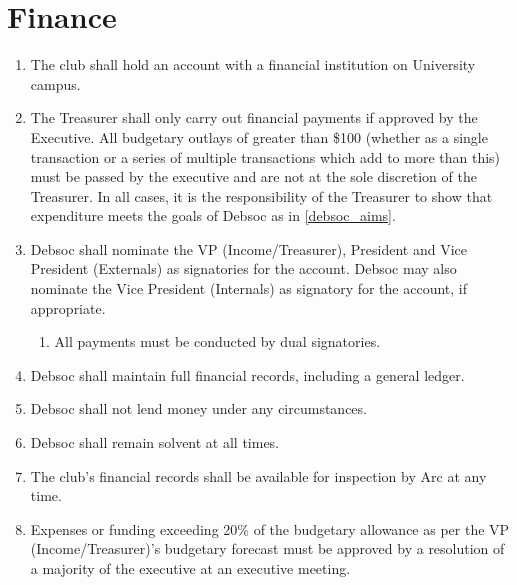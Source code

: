 \newpage
\section{Finance} \label{finances_section}

\begin{enumerate}
\item The club shall hold an account with a financial institution on University campus.
\item The Treasurer shall only carry out financial payments if approved by the Executive. All budgetary outlays of greater than \$100 (whether as a single transaction or a series of multiple transactions which add to more than this) must be passed by the executive and are not at the sole discretion of the Treasurer. In all cases, it is the responsibility of the Treasurer to show that expenditure meets the goals of Debsoc as in \ref{debsoc_aims}.
\item Debsoc shall nominate the VP (Income/Treasurer), President and Vice President (Externals) as signatories for the account. Debsoc may also nominate the Vice President (Internals) as signatory for the account, if appropriate.
\begin{enumerate}
    \item All payments must be conducted by dual signatories.
\end{enumerate}
\item Debsoc shall maintain full financial records, including a general ledger.
\item Debsoc shall not lend money under any circumstances.
\item Debsoc shall remain solvent at all times.
\item The club’s financial records shall be available for inspection by Arc at any time.
\item Expenses or funding exceeding 20\% of the budgetary allowance as per the VP (Income/Treasurer)’s budgetary forecast must be approved by a resolution of a majority of the executive at an executive meeting.
\end{enumerate}
